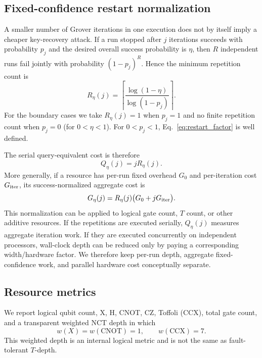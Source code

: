 \documentclass[pdflatex,sn-nature]{sn-jnl}
\theoremstyle{thmstyleone}
\theoremstyle{thmstyletwo}
\begin{document}
\subsection{Fixed-confidence restart normalization}
\label{subsec:fixed_confidence}
A smaller number of Grover iterations in one execution does not by itself imply a cheaper key-recovery attack.  If a run stopped after $j$ iterations succeeds with probability $p_j$ and the desired overall success probability is $\eta$, then $R$ independent runs fail jointly with probability $(1-p_j)^R$.  Hence the minimum repetition count is
\begin{equation}
    R_{\eta}(j)=
    \left\lceil
    \frac{\log(1-\eta)}{\log(1-p_j)}
    \right\rceil .
    \label{eq:restart_factor}
\end{equation}
For the boundary cases we take $R_{\eta}(j)=1$ when $p_j=1$ and no finite repetition count when $p_j=0$ (for $0<\eta<1$). For $0<p_j<1$, Eq.~\eqref{eq:restart_factor} is well defined.

The serial query-equivalent cost is therefore
\begin{equation}
    Q_{\eta}(j)=jR_{\eta}(j).
    \label{eq:fixed_success_cost}
\end{equation}
More generally, if a resource has per-run fixed overhead $G_0$ and per-iteration cost $G_{\rm iter}$, its success-normalized aggregate cost is
\begin{equation}
    G_{\eta}(j)=R_{\eta}(j)\bigl(G_0+jG_{\rm iter}\bigr).
    \label{eq:fixed_success_resource}
\end{equation}
This normalization can be applied to logical gate count, $T$ count, or other additive resources.  If the repetitions are executed serially, $Q_{\eta}(j)$ measures aggregate iteration work.  If they are executed concurrently on independent processors, wall-clock depth can be reduced only by paying a corresponding width/hardware factor.  We therefore keep per-run depth, aggregate fixed-confidence work, and parallel hardware cost conceptually separate.

\subsection{Resource metrics}
We report logical qubit count, X, H, CNOT, CZ, Toffoli (CCX), total gate count, and a transparent weighted NCT depth in which
\begin{equation}
    w(X)=w(\mathrm{CNOT})=1,\qquad w(\mathrm{CCX})=7.
\end{equation}
This weighted depth is an internal logical metric and is not the same as fault-tolerant $T$-depth.
\end{document}
